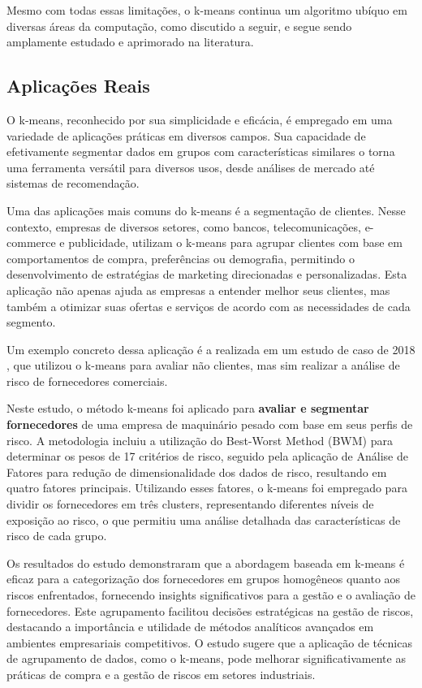\documentclass[12pt,
openright, 
oneside, %
a4paper,    %
brazil]{facom-ufu-abntex2}
\begin{document}
Mesmo com todas essas limitações, o k-means continua um algoritmo ubíquo em diversas áreas da computação, como discutido a seguir, e segue sendo amplamente estudado e aprimorado na literatura.


\subsection{Aplicações Reais}

O k-means, reconhecido por sua simplicidade e eficácia, é empregado em uma variedade de aplicações práticas em diversos campos. Sua capacidade de efetivamente segmentar dados em grupos com características similares o torna uma ferramenta versátil para diversos usos, desde análises de mercado até sistemas de recomendação.

Uma das aplicações mais comuns do k-means é a segmentação de clientes. Nesse contexto, empresas de diversos setores, como bancos, telecomunicações, e-commerce e publicidade, utilizam o k-means para agrupar clientes com base em comportamentos de compra, preferências ou demografia, permitindo o desenvolvimento de estratégias de marketing direcionadas e personalizadas. Esta aplicação não apenas ajuda as empresas a entender melhor seus clientes, mas também a otimizar suas ofertas e serviços de acordo com as necessidades de cada segmento.

Um exemplo concreto dessa aplicação é a realizada em um estudo de caso de 2018 \cite{kMeansSupplierRiskAss2018}, que utilizou o k-means para avaliar não clientes, mas sim realizar a análise de risco de fornecedores comerciais.

Neste estudo, o método k-means foi aplicado para \textbf{avaliar e segmentar fornecedores} de uma empresa de maquinário pesado com base em seus perfis de risco. A metodologia incluiu a utilização do Best-Worst Method (BWM) para determinar os pesos de 17 critérios de risco, seguido pela aplicação de Análise de Fatores para redução de dimensionalidade dos dados de risco, resultando em quatro fatores principais. Utilizando esses fatores, o k-means foi empregado para dividir os fornecedores em três clusters, representando diferentes níveis de exposição ao risco, o que permitiu uma análise detalhada das características de risco de cada grupo.

Os resultados do estudo demonstraram que a abordagem baseada em k-means é eficaz para a categorização dos fornecedores em grupos homogêneos quanto aos riscos enfrentados, fornecendo insights significativos para a gestão e o avaliação de fornecedores. Este agrupamento facilitou decisões estratégicas na gestão de riscos, destacando a importância e utilidade de métodos analíticos avançados em ambientes empresariais competitivos. O estudo sugere que a aplicação de técnicas de agrupamento de dados, como o k-means, pode melhorar significativamente as práticas de compra e a gestão de riscos em setores industriais.
\end{document}
